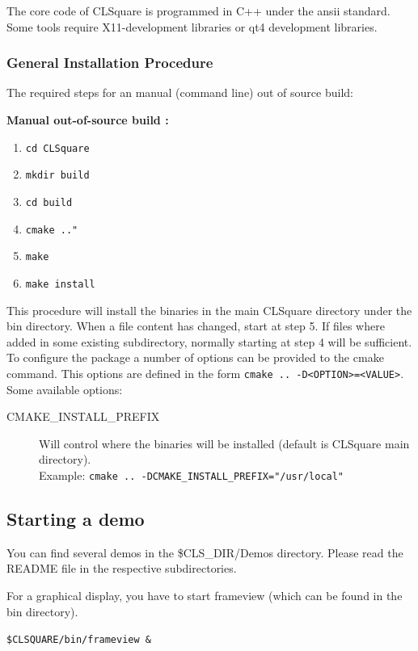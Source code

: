 \documentclass[a4paper,12pt,german]{article}
\newcommand{\clsdir}{{\$CLS\_DIR}}
\newcommand{\anmerkung}[2]{\vspace*{0.01cm}\begin{center}\begin{graybox}{\bf #1 :\\}{\em #2}\end{graybox}\end{center}\vspace*{0.1cm}}
\begin{document}
The core code of CLSquare is programmed in C++ under the ansii standard.
Some tools require X11-development libraries or qt4 development libraries.

\subsubsection{General Installation Procedure}
The required steps for an manual (command line) out of source build:
\anmerkung{Manual out-of-source build}
{\begin{enumerate}
\item \lstinline|cd CLSquare|
\item \lstinline|mkdir build|
\item \lstinline|cd build|
\item \lstinline|cmake .."|
\item \lstinline|make|
\item \lstinline|make install|
\end{enumerate}
}
This procedure will install the binaries in the main CLSquare directory under the bin directory.
When a file content has changed, start at step 5. If files where added in some existing subdirectory, normally starting at step 4 will be sufficient.\\

To configure the package a number of options can be provided to the cmake command. 
This options are defined in the form \lstinline|cmake .. -D<OPTION>=<VALUE>|.
Some available options:
\begin{description}
\item[CMAKE\_INSTALL\_PREFIX] Will control where the binaries will be installed (default is CLSquare main directory).\\
Example: \lstinline|cmake .. -DCMAKE_INSTALL_PREFIX="/usr/local"|
\end{description}



\subsection{Starting a demo}

You can find several demos in the \clsdir/Demos directory. Please read the README file in the
respective subdirectories.


For a graphical display, you have to start frameview (which can be found in the bin directory).

\texttt{\$CLSQUARE/bin/frameview \& }
\end{document}
